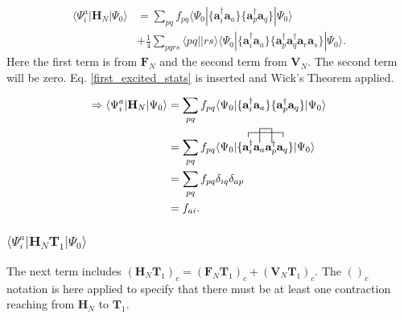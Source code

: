 \documentclass[a4paper,norsk,11pt,twoside]{report}
\begin{document}
\begin{align}
\langle \Psi_i^a | \textbf{H}_N | \Psi_0 \rangle & = 
\sum_{pq} f_{pq} \langle \Psi_0| \{ \textbf{a}^{\dag}_i \textbf{a}_a \} \{ \textbf{a}^{\dag}_p \textbf{a}_q \} | \Psi_0 \rangle \nonumber \\ &
+ \frac{1}{4} \sum_{pqrs} \langle pq||rs \rangle  \langle \Psi_0| \{ \textbf{a}^{\dag}_i \textbf{a}_a \} \{ \textbf{a}^{\dag}_p \textbf{a}^{\dag}_q \textbf{a}_r \textbf{a}_s \} | \Psi_0 \rangle .
\end{align}
Here the first term is from $\textbf{F}_N$ and the second term from $\textbf{V}_N$. The second term will be zero. Eq. \eqref{first_excited_stats} is inserted and Wick's Theorem applied.

\begin{align}
\Rightarrow \langle \Psi_i^a | \textbf{H}_N | \Psi_0 \rangle & = \sum_{pq} f_{pq} \langle \Psi_0| \{ \textbf{a}^{\dag}_i \textbf{a}_a \} \{ \textbf{a}^{\dag}_p \textbf{a}_q \} | \Psi_0 \rangle \nonumber \\ &
= \sum_{pq} f_{pq} \langle \Psi_0| \{
\contraction{}{\textbf{a}^{\dag}_i}{\textbf{a}_a \textbf{a}^{\dag}_p}{\textbf{a}_q}
\contraction[3ex]{\textbf{a}^{\dag}_i}{\textbf{a}_a}{}{\textbf{a}^{\dag}_p}
\textbf{a}^{\dag}_i \textbf{a}_a \textbf{a}^{\dag}_p \textbf{a}_q 
 \} | \Psi_0 \rangle \nonumber \\ &
= \sum_{pq} f_{pq} \delta_{iq} \delta_{ap} \nonumber \\ &
= f_{ai} . \label{t1amp_1}
\end{align}

\subsubsection{$\langle \Psi_i^a | \textbf{H}_N \textbf{T}_1 | \Psi_0 \rangle$}

The next term includes $(\textbf{H}_N \textbf{T}_1)_c = (\textbf{F}_N
\textbf{T}_1)_c + (\textbf{V}_N \textbf{T}_1)_c$. The $()_c$ notation
is here applied to specify that there must be at least one contraction
reaching from $\textbf{H}_N$ to $\textbf{T}_1$.
\end{document}
